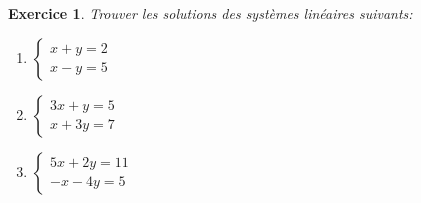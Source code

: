 \documentclass[12pt]{article}
\newtheorem{exercice}{\bf Exercice}
\newenvironment{exo}{
\begin{exercice}\smallskip\normalfont}{\end{exercice}
}
\begin{document}

\begin{exo} Trouver les solutions des syst\`emes lin\'eaires suivants:
\begin{multicols}{3}
\begin{enumerate}
\item
  $
    \left\{
      \begin{array}{l}
        x + y = 2
        \\
        x - y = 5
      \end{array}
    \right.
  $
\item
  $
    \left\{
      \begin{array}{l}
        3x + y = 5
        \\
        x + 3y = 7
      \end{array}
    \right.
    $
    \item
  $
    \left\{
      \begin{array}{l}
        5x + 2y = 11
        \\
        -x -4y = 5
      \end{array}
    \right.
  $
\end{enumerate}
\end{multicols}
\end{exo}
\end{document}
